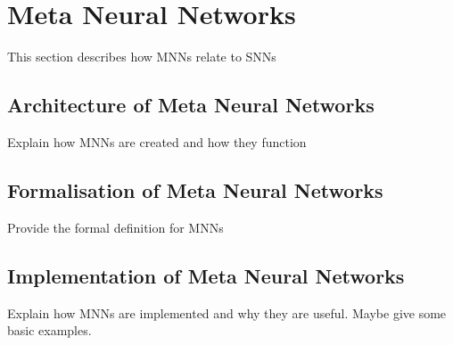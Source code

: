 \section{Meta Neural Networks}
This section describes how MNNs relate to SNNs 

\subsection{Architecture of Meta Neural Networks}
Explain how MNNs are created and how they function

\subsection{Formalisation of Meta Neural Networks}
Provide the formal definition for MNNs

\subsection{Implementation of Meta Neural Networks}
Explain how MNNs are implemented and why they are useful. Maybe give some basic examples.